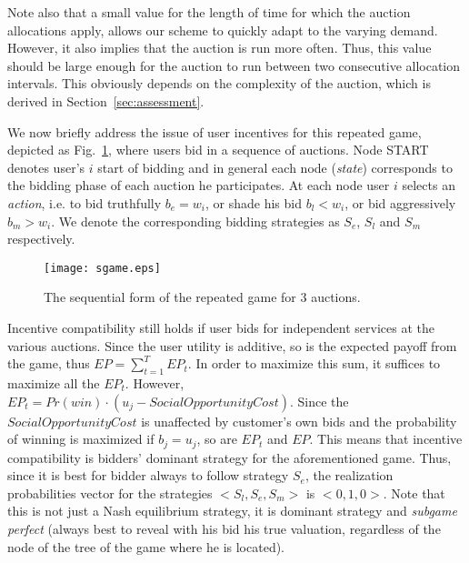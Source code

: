 \documentclass[a4paper]{article}
\begin{document}
Note also that a small value for the length of time for which the 
auction allocations apply, allows our scheme to quickly
adapt to the varying demand. However, it also implies that 
the auction is run more often. Thus, this value
should be large enough for the auction to run between two consecutive allocation 
intervals. This obviously depends on the complexity of the auction,
which is derived in Section~\ref{sec:assessment}.

We now briefly address the issue of user incentives for this repeated game,
depicted as Fig.~\ref{fig:sgame}, where users bid in a sequence of auctions. 
Node START denotes user's $i$ start of bidding and in general each node 
({\em state}) corresponds to the bidding phase of each auction he participates. 
At each node user $i$ selects an {\em action}, i.e. to bid truthfully
$b_e = w_i$, or shade his bid $b_l < w_i$, or bid aggressively $b_m > w_i$.
We denote the corresponding bidding strategies as $S_e$, $S_l$ and $S_m$
respectively.

\begin{figure}[htbp]
	\centering\texttt{[image: sgame.eps]}
	\caption{The sequential form of the repeated game for 3 auctions.}
	\label{fig:sgame}
\end{figure}

Incentive compatibility still holds if user bids for independent services at the
various auctions. Since the user utility is additive, 
so is the expected payoff from the  game, thus $EP = \sum_{t=1}^{T} EP_t$. 
In order to maximize this sum, it suffices to maximize all the $EP_t$. However, 
$EP_t = Pr(win) \cdot (u_j - SocialOpportunityCost)$. Since the $SocialOpportunityCost$
is unaffected by customer's own bids and the probability of winning is
maximized if $b_j = u_j$, so are $EP_t$ and $EP$. This means that incentive
compatibility is bidders' dominant strategy for the aforementioned game.
Thus, since it is best for bidder always to follow strategy $S_e$, the realization 
probabilities vector for the strategies $<S_l, S_e, S_m>$ is $<0, 1, 0>$. Note that
this is not just a Nash equilibrium strategy, it is dominant strategy and
{\em subgame perfect} (always best to reveal with his bid his true valuation, regardless
of the node of the tree of the game where he is located).
\end{document}
